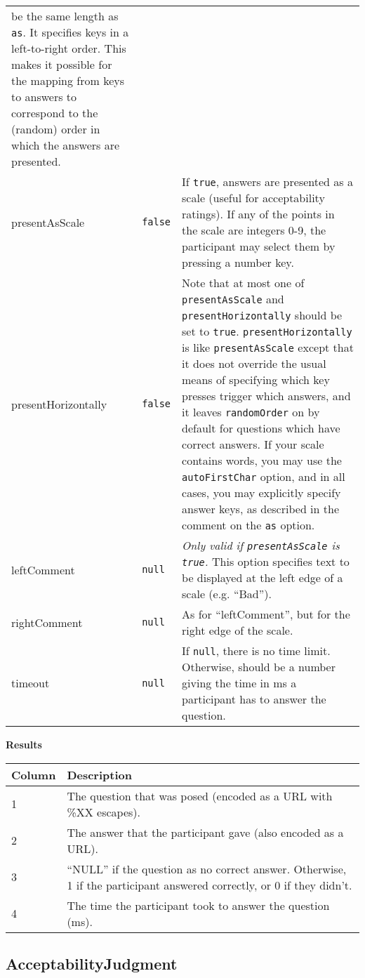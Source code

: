 \documentclass[]{article}
\begin{document}
\begin{longtable}[c]{p{1in}p{1in}p{3.85in}}
be the same length as \texttt{as}. It specifies keys in a left-to-right
order. This makes it possible for the mapping from keys to answers to
correspond to the (random) order in which the answers are
presented.\tabularnewline
presentAsScale & \texttt{false} & If \texttt{true}, answers are
presented as a scale (useful for acceptability ratings). If any of the
points in the scale are integers 0-9, the participant may select them by
pressing a number key.\tabularnewline
presentHorizontally & \texttt{false} & Note that at most one of
\texttt{presentAsScale} and \texttt{presentHorizontally} should be set
to \texttt{true}. \texttt{presentHorizontally} is like
\texttt{presentAsScale} except that it does not override the usual means
of specifying which key presses trigger which answers, and it leaves
\texttt{randomOrder} on by default for questions which have correct
answers. If your scale contains words, you may use the
\texttt{autoFirstChar} option, and in all cases, you may explicitly
specify answer keys, as described in the comment on the \texttt{as}
option.\tabularnewline
leftComment & \texttt{null} & \emph{Only valid if
\texttt{presentAsScale} is \texttt{true}.} This option specifies text to
be displayed at the left edge of a scale (e.g. ``Bad'').\tabularnewline
rightComment & \texttt{null} & As for ``leftComment'', but for the right
edge of the scale.\tabularnewline
timeout & \texttt{null} & If \texttt{null}, there is no time limit.
Otherwise, should be a number giving the time in ms a participant has to
answer the question.\tabularnewline
\bottomrule
\end{longtable}

\textbf{Results}

\begin{longtable}[c]{p{1in}p{5in}}
\toprule
\textbf{Column} & \textbf{Description}\tabularnewline
\midrule
\endhead
1 & The question that was posed (encoded as a URL with \%XX
escapes).\tabularnewline
2 & The answer that the participant gave (also encoded as a
URL).\tabularnewline
3 & ``NULL'' if the question as no correct answer. Otherwise, 1 if the
participant answered correctly, or 0 if they didn't.\tabularnewline
4 & The time the participant took to answer the question
(ms).\tabularnewline
\bottomrule
\end{longtable}

\subsection{AcceptabilityJudgment}\label{acceptabilityjudgment}
\end{document}

